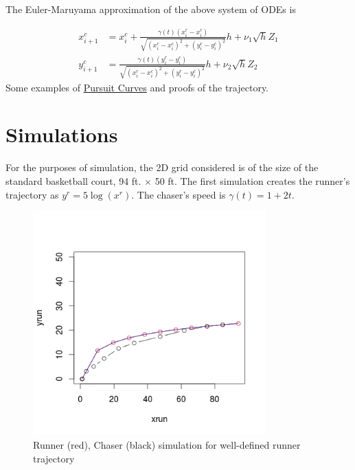 \documentclass[a4paper,11pt]{article}
\begin{document}
The Euler-Maruyama approximation of the above system of ODEs is

\begin{align*}
x^{c}_{i+1} & = x^{c}_{i} + \frac{\gamma(t) (x^{r}_{i} - x^{c}_{i})}{\sqrt{(x^{r}_{i} - x^{c}_{i})^2 + (y^{r}_{i} - y^{c}_{i})^2}} h + \nu_1 \sqrt{h} Z_1 \\
y^{c}_{i+1} & = \frac{\gamma(t) (y^{r}_{i} - y^{c}_{i})}{\sqrt{(x^{r}_{i} - x^{c}_{i})^2 + (y^{r}_{i} - y^{c}_{i})^2}}h + \nu_2 \sqrt{h} Z_2
\end{align*}
Some examples of  \href{http://home2.fvcc.edu/~dhicketh/DiffEqns/Spring11projects/Jonah_Franchi_Katy_Steiner/Diff%20EQ%20Project.pdf}{Pursuit Curves} and proofs of the trajectory.

\section{Simulations}
For the purposes of simulation, the 2D grid considered is of the size of the standard basketball court, 94 ft. $\times$ 50 ft. The first simulation creates the runner's trajectory as $y^{r} = 5\log(x^{r})$. The chaser's speed is $\gamma(t) = 1+2t$. 

\begin{figure}[H]
\centering
\includegraphics[width=0.8\textwidth]{simulation.jpeg}
\caption{Runner (red), Chaser (black) simulation for well-defined runner trajectory}
\end{figure}
\end{document}
